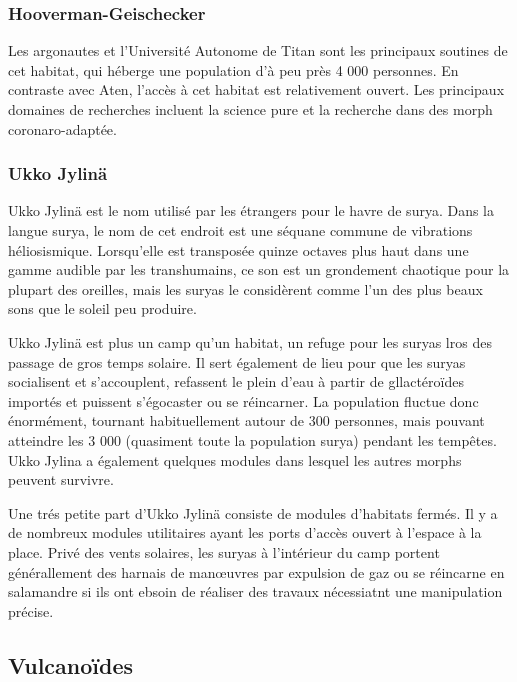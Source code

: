 \subsubsection{Hooverman-Geischecker} \label{sec:hoov-geisch} 

Les argonautes et l'Université Autonome de Titan sont les principaux soutines de cet habitat, qui héberge une population d'à peu près 4 000 personnes. En contraste avec Aten, l'accès à cet habitat est relativement ouvert. Les principaux domaines de recherches incluent la science pure et la recherche dans des morph coronaro-adaptée. 

\subsubsection{Ukko Jylinä} \label{sec:ukko-jylina} 

Ukko Jylinä est le nom utilisé par les étrangers pour le havre de surya. Dans la langue surya, le nom de cet endroit est une séquane commune de vibrations héliosismique. Lorsqu'elle est transposée quinze octaves plus haut dans une gamme audible par les transhumains, ce son est un grondement chaotique pour la plupart des oreilles, mais les suryas le considèrent comme l'un des plus beaux sons que le soleil peu produire. 

Ukko Jylinä est plus un camp qu'un habitat, un refuge pour les suryas lros des passage de gros temps solaire. Il sert également de lieu pour que les suryas socialisent et s'accouplent, refassent le plein d'eau à partir de gllactéroïdes importés et puissent s'égocaster ou se réincarner. La population fluctue donc énormément, tournant habituellement autour de 300 personnes, mais pouvant atteindre les 3 000 (quasiment toute la population surya) pendant les tempêtes. Ukko Jylina a également quelques modules dans lesquel les autres morphs peuvent survivre. 

Une trés petite part d'Ukko Jylinä consiste de modules d'habitats fermés. Il y a de nombreux modules utilitaires ayant les ports d'accès ouvert à l'espace à la place. Privé des vents solaires, les suryas à l'intérieur du camp portent générallement des harnais de manœuvres par expulsion de gaz ou se réincarne en salamandre si ils ont ebsoin de réaliser des travaux nécessiatnt une manipulation précise. 

\subsection{Vulcanoïdes} \label{sec:vulcanoids} 

